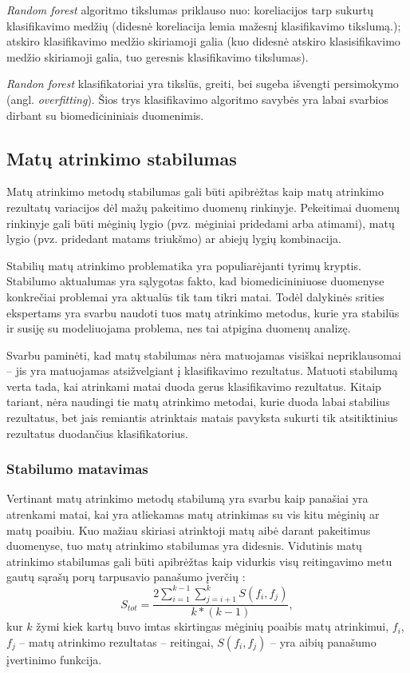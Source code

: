 \textit{Random forest} algoritmo tikslumas priklauso nuo: koreliacijos tarp sukurtų klasifikavimo medžių (didesnė koreliacija lemia mažesnį klasifikavimo tikslumą.); atskiro klasifikavimo medžio skiriamoji galia (kuo didesnė atskiro klasisifikavimo medžio skiriamoji galia, tuo geresnis klasifikavimo tikslumas).

\textit{Randon forest} klasifikatoriai yra tikslūs, greiti, bei sugeba išvengti persimokymo (angl. \textit{overfitting}). Šios trys klasifikavimo algoritmo savybės yra labai svarbios dirbant su biomedicininiais duomenimis. 

\subsection{Matų atrinkimo stabilumas}

Matų atrinkimo metodų stabilumas gali būti apibrėžtas kaip matų atrinkimo rezultatų variacijos dėl mažų pakeitimo duomenų rinkinyje. Pekeitimai duomenų rinkinyje gali būti mėginių lygio (pvz. mėginiai pridedami arba atimami), matų lygio (pvz. pridedant matams triukšmo) ar abiejų lygių kombinacija.

Stabilių matų atrinkimo problematika yra populiarėjanti tyrimų kryptis. Stabilumo aktualumas yra sąlygotas fakto, kad biomedicininiuose duomenyse konkrečiai problemai yra aktualūs tik tam tikri matai. Todėl dalykinės srities ekspertams yra svarbu naudoti tuos matų atrinkimo metodus, kurie yra stabilūs ir susiję su modeliuojama problema, nes tai atpigina duomenų analizę. 

Svarbu paminėti, kad matų stabilumas nėra matuojamas visiškai nepriklausomai -- jis yra matuojamas atsižvelgiant į klasifikavimo rezultatus. Matuoti stabilumą verta tada, kai atrinkami matai duoda gerus klasifikavimo rezultatus. Kitaip tariant, nėra naudingi tie matų atrinkimo metodai, kurie duoda labai stabilius rezultatus, bet jais remiantis atrinktais matais pavyksta sukurti tik atsitiktinius rezultatus duodančius klasifikatorius.

\subsubsection{Stabilumo matavimas}

Vertinant matų atrinkimo metodų stabilumą yra svarbu kaip panašiai yra atrenkami matai, kai yra atliekamas matų atrinkimas su vis kitu mėginių ar matų poaibiu. Kuo mažiau skiriasi atrinktoji matų aibė darant pakeitimus duomenyse, tuo matų atrinkimo stabilumas yra didesnis. Vidutinis matų atrinkimo stabilumas gali būti apibrėžtas kaip vidurkis visų reitingavimo metu gautų sąrašų porų tarpusavio panašumo įverčių \cite{kalousis2007stability}:
\begin{equation}
 S_{tot}=\frac{2\sum_{i=1}^{k-1}\sum_{j=i+1}^{k} S(f_i, f_j)}{k*(k-1)},
\end{equation} 
kur $k$ žymi kiek kartų buvo imtas skirtingas mėginių poaibis matų atrinkimui,
$f_i$, $f_j$ -- matų atrinkimo rezultatas -- reitingai, 
$S(f_i, f_j)$ -- yra aibių panašumo įvertinimo funkcija.

